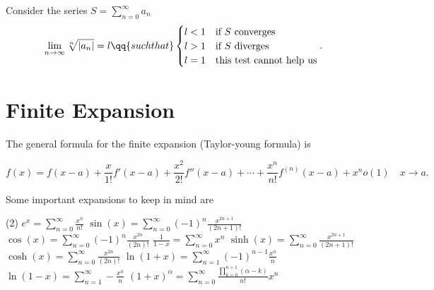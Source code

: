 \begin{theorem}
	Consider the series $S=\sum_{n=0}^{\infty} a_n$
	\[
		\lim_{n \to \infty}\sqrt[n]{|a_n|} = l\qq{such that} \begin{cases}l<1 & \text{if $S$ converges}         \\
			l>1 & \text{if $S$ diverges}          \\
			l=1 & \text{this test cannot help us} \\
		\end{cases}
		.\]
\end{theorem}
\section{Finite Expansion}
The general formula for the finite expansion (Taylor-young formula) is

\[
	f(x) = f(x-a)+ \frac{x}{1!}f'(x-a)+\frac{x^2}{2!}f''(x-a)+\cdots+\frac{x^n}{n!}f^{(n)}(x-a)+x^no(1) \quad x\to a
	.\]

Some important expansions to keep in mind are
\begin{tasks}(2)
	\task $e^x=\sum_{n=0}^{\infty} \frac{x^n}{n!}$
	\task $\sin(x)=\sum_{n=0}^{\infty} (-1)^n \frac{x^{2n+1}}{(2n+1)!}$
	\task $\cos(x)=\sum_{n=0}^{\infty} (-1)^n \frac{x^{2n}}{(2n)!}$
	\task $\frac{1}{1-x}=\sum_{n=0}^{\infty} x^n$
	\task $\sinh(x)=\sum_{n=0}^{\infty} \frac{x^{2n+1}}{(2n+1)!}$
	\task $\cosh(x)=\sum_{n=0}^{\infty} \frac{x^{2n}}{(2n)!}$
	\task $\ln(1+x)=\sum_{n=1}^{\infty} (-1)^{n-1}\frac{x^n}{n}$
	\task $\ln(1-x)=\sum_{n=1}^{\infty} -\frac{x^n}{n}$
	\task $(1+x)^\alpha=\sum_{n=0}^{\infty} \frac{\prod_{k=0}^{n+1}(\alpha-k)  }{n!}x^n$
\end{tasks}
